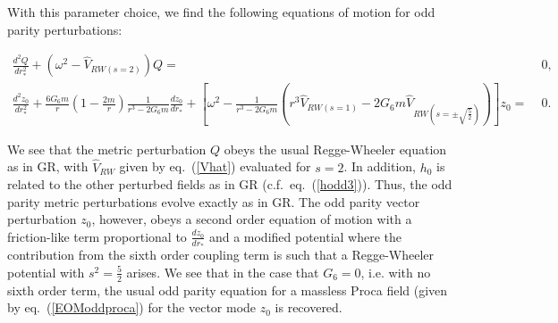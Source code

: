\documentclass[10pt,twocolumn,preprintnumbers,amsmath,amssymb,nofootinbib
,superscriptaddress]{revtex4-1}
\begin{document}
{{{With this parameter choice, we find the following equations of motion for odd parity perturbations:
\begin{widetext}
\begin{align}
\frac{d^2Q}{dr_\ast^2}+\left(\omega^2-\hat{V}_{RW(s=2)}\right)Q=&\;0,\nonumber\\
\frac{d^2z_0}{dr_\ast^2}+\frac{6G_6m}{r}\left(1-\frac{2m}{r}\right)\frac{1}{r^3-2G_6m}\frac{dz_0}{dr_\ast}+\left[\omega^2-\frac{1}{r^3-2G_6m}\left(r^3\hat{V}_{RW(s=1)}-2G_6m\hat{V}_{RW(s=\pm\sqrt{\frac{5}{2}})}\right)\right]z_0=&\;0.\label{EOModdproca6}
\end{align}
\end{widetext}
We see that the metric perturbation $Q$ obeys the usual Regge-Wheeler equation as in GR, with $\hat{V}_{RW}$ given by eq.~(\ref{Vhat}) evaluated for $s=2$. In addition, $h_0$ is related to the other perturbed fields as in GR (c.f.~eq.~(\ref{hodd3})). Thus, the odd parity metric perturbations evolve exactly as in GR. The odd parity vector perturbation $z_0$, however, obeys a second order equation of motion with a friction-like term proportional to $\frac{dz_0}{dr_\ast}$ and a modified potential where the contribution from the sixth order coupling term is such that a Regge-Wheeler potential with $s^2=\frac{5}{2}$ arises. We see that in the case that $G_6=0$, i.e. with no sixth order term, the usual odd parity equation for a massless Proca field (given by eq.~(\ref{EOModdproca}) for the vector mode $z_0$ is recovered.

}}}
\end{document}
